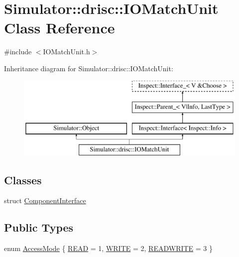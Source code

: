 \hypertarget{class_simulator_1_1drisc_1_1_i_o_match_unit}{\section{Simulator\+:\+:drisc\+:\+:I\+O\+Match\+Unit Class Reference}
\label{class_simulator_1_1drisc_1_1_i_o_match_unit}
}


{\ttfamily \#include $<$I\+O\+Match\+Unit.\+h$>$}

Inheritance diagram for Simulator\+:\+:drisc\+:\+:I\+O\+Match\+Unit\+:\begin{figure}[H]
\begin{center}
\leavevmode
\includegraphics[height=4.000000cm]{class_simulator_1_1drisc_1_1_i_o_match_unit}
\end{center}
\end{figure}
\subsection*{Classes}
\begin{DoxyCompactItemize}
\item 
struct \hyperlink{struct_simulator_1_1drisc_1_1_i_o_match_unit_1_1_component_interface}{Component\+Interface}
\end{DoxyCompactItemize}
\subsection*{Public Types}
\begin{DoxyCompactItemize}
\item 
enum \hyperlink{class_simulator_1_1drisc_1_1_i_o_match_unit_ab8216ac84dabbc1133fe4d26298de231}{Access\+Mode} \{ \hyperlink{class_simulator_1_1drisc_1_1_i_o_match_unit_ab8216ac84dabbc1133fe4d26298de231a24b95e35e70eb151255c43600be2ea89}{R\+E\+A\+D} = 1, 
\hyperlink{class_simulator_1_1drisc_1_1_i_o_match_unit_ab8216ac84dabbc1133fe4d26298de231a2c7639b1ed72e67c64f498c8f8e0633b}{W\+R\+I\+T\+E} = 2, 
\hyperlink{class_simulator_1_1drisc_1_1_i_o_match_unit_ab8216ac84dabbc1133fe4d26298de231ac78bfb0330f02b92176f4dd2a9212601}{R\+E\+A\+D\+W\+R\+I\+T\+E} = 3
 \}
\end{DoxyCompactItemize}
